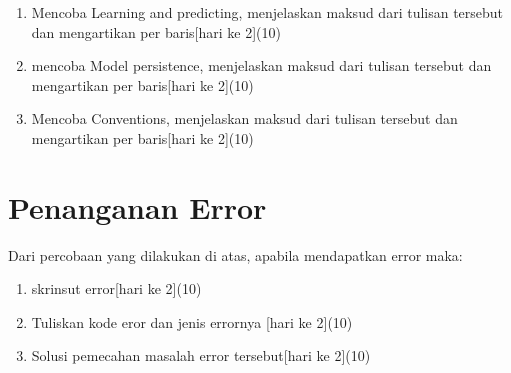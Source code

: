 \begin{enumerate}
\item
Mencoba Learning and predicting, menjelaskan maksud dari tulisan tersebut dan mengartikan per baris[hari ke 2](10)
\item
mencoba Model persistence, menjelaskan maksud dari tulisan tersebut dan mengartikan per baris[hari ke 2](10)
\item 
Mencoba Conventions, menjelaskan maksud dari tulisan tersebut dan mengartikan per baris[hari ke 2](10)
\end{enumerate}


\section{Penanganan Error}
Dari percobaan yang dilakukan di atas, apabila mendapatkan error maka:

\begin{enumerate}
	\item
	skrinsut error[hari ke 2](10)
	\item
Tuliskan kode eror dan jenis errornya [hari ke 2](10)
	\item
Solusi pemecahan masalah error tersebut[hari ke 2](10)

\end{enumerate}

